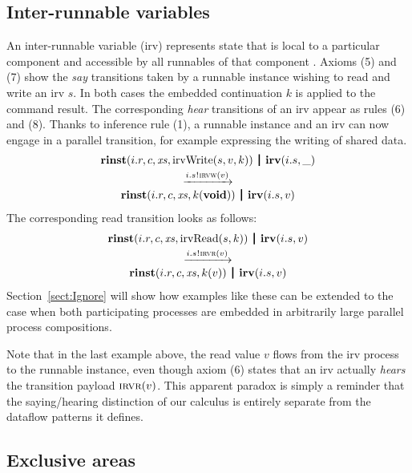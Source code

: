 \documentclass[10pt,conference]{IEEEtran}
\begin{document}
\subsection{Inter-runnable variables}

An inter-runnable variable (irv) represents state that is local to a particular component and accessible by all runnables of that component \cite[ch.~4.3.3.1]{AR:RTE}. Axioms (5) and (7) show the \emph{say} transitions taken by a runnable instance wishing to read and write an irv $s$. In both cases the embedded continuation $k$ is applied to the command result. The corresponding \emph{hear} transitions of an irv appear as rules (6) and (8). Thanks to inference rule (1), a runnable instance and an irv can now engage in a parallel transition, for example expressing the writing of shared data.
$$
\begin{array}{c}
  \Tpar {\Trinst {i.r} c \Xs {\TrteIrvWrite s v k}}
        {\Tirv {i.s} \_} \vspace{0.6ex} \\
  \red {\say {i.s} {\Tirvw v}} \\
  \Tpar {\Trinst {i.r} c \Xs {\Tap k \Tvoid}}
        {\Tirv {i.s} v}
\end{array}
$$
The corresponding read transition looks as follows:
$$
\begin{array}{c}
  \Tpar {\Trinst {i.r} c \Xs {\TrteIrvRead s k}}
        {\Tirv {i.s} v} \vspace{0.6ex} \\
  \red {\say {i.s} {\Tirvr v}} \\
  \Tpar {\Trinst {i.r} c \Xs {\Tap k v}}
        {\Tirv {i.s} v}
\end{array}
$$
Section~\ref{sect:Ignore} will show how examples like these can be extended to the case when both participating processes are embedded in arbitrarily large parallel process compositions.

Note that in the last example above, the read value $v$ flows from the irv process to the runnable instance, even though axiom (6) states that an irv actually \emph{hears} the transition payload $\textsc{irvr}(v)$. This apparent paradox is simply a reminder that the saying/hearing distinction of our calculus is entirely separate from the dataflow patterns it defines.


\subsection{Exclusive areas}
\end{document}
